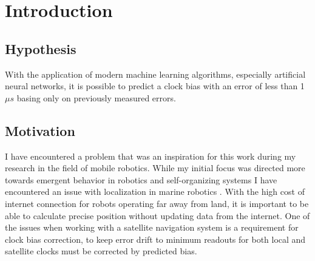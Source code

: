 \chapter{Introduction}

\section{Hypothesis}
With the application of modern machine learning algorithms, especially artificial neural networks,
it is possible to predict a clock bias with an error of less than 1 $\mu s$ basing only on
previously measured errors. 



\section{Motivation}
I have encountered a problem that was an inspiration for this work during my research in the 
field of mobile robotics.
While my initial focus was directed more towards emergent behavior in robotics and self-organizing 
systems \cite{Gnys2017}\cite{Gnys2019} I have encountered an issue with localization in marine 
robotics \cite{Cabrera-Gamez2014}.
With the high cost of internet connection for robots operating far away from land, 
it is important to be able to calculate precise position without updating data from the internet.
One of the issues when working with a satellite navigation system is a requirement for clock bias
correction, to keep error drift to minimum readouts for both local and satellite clocks must
be corrected by predicted bias.
